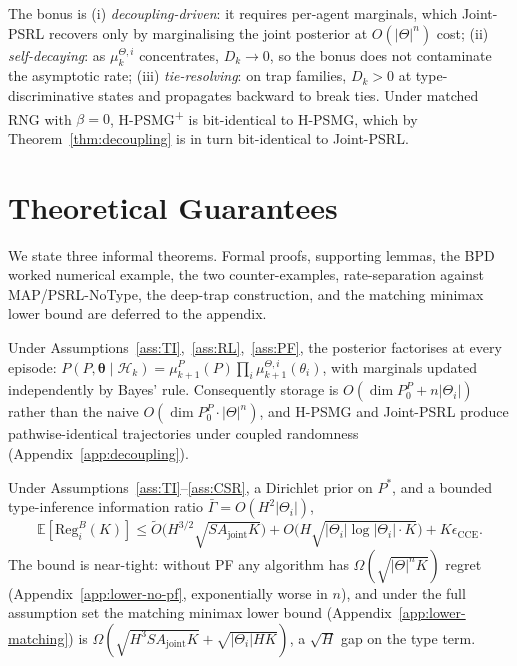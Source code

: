 The bonus is (i) \emph{decoupling-driven}: it requires per-agent marginals, which Joint-PSRL recovers only by marginalising the joint posterior at $O(|\Theta|^n)$ cost; (ii) \emph{self-decaying}: as $\mu_k^{\Theta,i}$ concentrates, $D_k\!\to\!0$, so the bonus does not contaminate the asymptotic rate; (iii) \emph{tie-resolving}: on trap families, $D_k>0$ at type-discriminative states and propagates backward to break ties. Under matched RNG with $\beta=0$, H-PSMG\textsuperscript{+} is bit-identical to H-PSMG, which by Theorem~\ref{thm:decoupling} is in turn bit-identical to Joint-PSRL.

\section{Theoretical Guarantees}
\label{sec:theory}

We state three informal theorems. Formal proofs, supporting lemmas, the BPD worked numerical example, the two counter-examples, rate-separation against MAP/PSRL-NoType, the deep-trap construction, and the matching minimax lower bound are deferred to the appendix.

\begin{theorem}\label{thm:decoupling}
Under Assumptions~\ref{ass:TI},~\ref{ass:RL},~\ref{ass:PF}, the posterior factorises at every episode:
$P(P,\boldsymbol\theta\!\mid\!\mathcal H_k)=\mu_{k+1}^P(P)\prod_{i}\mu_{k+1}^{\Theta,i}(\theta_i)$,
with marginals updated independently by Bayes' rule. Consequently storage is $O(\dim P_0^P + n|\Theta_i|)$ rather than the naive $O(\dim P_0^P\cdot|\Theta|^n)$, and H-PSMG and Joint-PSRL produce pathwise-identical trajectories under coupled randomness (Appendix~\ref{app:decoupling}).
\end{theorem}

\begin{theorem}\label{thm:main-regret-informal}
Under Assumptions~\ref{ass:TI}--\ref{ass:CSR}, a Dirichlet prior on $P^*$, and a bounded type-inference information ratio $\bar\Gamma = O(H^2|\Theta_i|)$,
\begin{equation*}
\mathbb{E}[\mathrm{Reg}_i^B(K)] \leq \tilde O\!\big(H^{3/2}\sqrt{S A_{\mathrm{joint}} K}\big) + O\!\big(H\sqrt{|\Theta_i|\log|\Theta_i|\cdot K}\big) + K\epsilon_{\mathrm{CCE}}.
\end{equation*}
The bound is near-tight: without PF any algorithm has $\Omega(\sqrt{|\Theta|^n K})$ regret (Appendix~\ref{app:lower-no-pf}, exponentially worse in $n$), and under the full assumption set the matching minimax lower bound (Appendix~\ref{app:lower-matching}) is $\Omega(\sqrt{H^3 S A_{\mathrm{joint}} K}+\sqrt{|\Theta_i| H K})$, a $\sqrt H$ gap on the type term.
\end{theorem}

